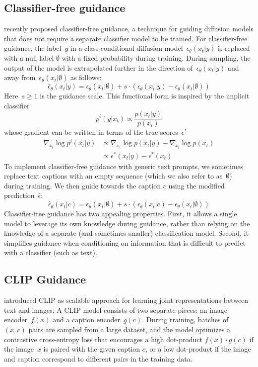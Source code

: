 \documentclass{article}
\begin{document}
\subsection{Classifier-free guidance}
\label{sec:uncondguidance}
\citet{uncond} recently proposed classifier-free guidance, a technique for guiding diffusion models that does not require a separate classifier model to be trained. For classifier-free guidance, the label~$y$ in a class-conditional diffusion model~$\epsilon_{\theta}(x_t|y)$ is replaced with a null label $\emptyset$ with a fixed probability during training. During sampling, the output of the model is extrapolated further in the direction of~$\epsilon_{\theta}(x_t|y)$ and away from~$\epsilon_{\theta}(x_t|\emptyset)$ as follows:
%
$$\hat{\epsilon}_{\theta}(x_t|y) = \epsilon_{\theta}(x_t|\emptyset) + s \cdot (\epsilon_{\theta}(x_t|y) - \epsilon_{\theta}(x_t|\emptyset))$$
%
Here~$s \ge 1$ is the guidance scale. This functional form is inspired by the implicit classifier $$p^{i}(y|x_t) \propto \frac{p(x_t|y)}{p(x_t)}$$ whose gradient can be written in terms of the true scores~$\epsilon^{*}$ 
\begin{align*}
\nabla_{x_t} \log p^{i}(x_t|y) &\propto \nabla_{x_t} \log p(x_t|y) - \nabla_{x_t} \log p(x_t) \\
&\propto \epsilon^{*}(x_t|y) - \epsilon^{*}(x_t)    
\end{align*}
To implement classifier-free guidance with generic text prompts, we sometimes replace text captions with an empty sequence (which we also refer to as~$\emptyset$) during training. We then guide towards the caption $c$ using the modified prediction~$\hat{\epsilon}$:
$$\hat{\epsilon}_{\theta}(x_t|c) = \epsilon_{\theta}(x_t|\emptyset) + s \cdot (\epsilon_{\theta}(x_t|c) - \epsilon_{\theta}(x_t|\emptyset))$$
Classifier-free guidance has two appealing properties. First, it allows a single model to leverage its own knowledge during guidance, rather than relying on the knowledge of a separate (and sometimes smaller) classification model. Second, it simplifies guidance when conditioning on information that is difficult to predict with a classifier (such as text).

\subsection{CLIP Guidance}
\label{sec:clip}

\citet{clip} introduced CLIP as scalable approach for learning joint representations between text and images. A CLIP model consists of two separate pieces: an image encoder~$f(x)$ and a caption encoder~$g(c)$. During training, batches of~$(x, c)$ pairs are sampled from a large dataset, and the model optimizes a contrastive cross-entropy loss that encourages a high dot-product $f(x) \cdot g(c)$ if the image~$x$ is paired with the given caption $c$, or a low dot-product if the image and caption correspond to different pairs in the training data.
\end{document}
